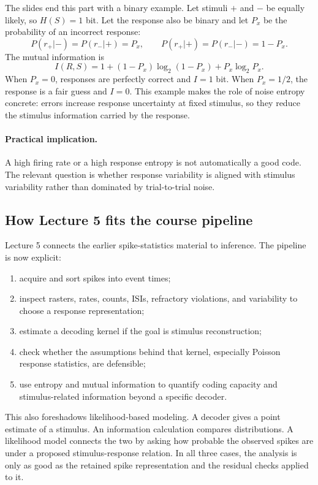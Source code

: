 The slides end this part with a binary example. Let stimuli $+$ and $-$ be equally likely, so $H(S)=1$ bit. Let the response also be binary and let $P_x$ be the probability of an incorrect response:
\[
    P(r_+|-)=P(r_-|+)=P_x,\qquad
    P(r_+|+)=P(r_-|-)=1-P_x.
\]
The mutual information is
\[
    I(R,S)
    =
    1
    +(1-P_x)\log_2(1-P_x)
    +P_x\log_2 P_x.
\]
When $P_x=0$, responses are perfectly correct and $I=1$ bit. When $P_x=1/2$, the response is a fair guess and $I=0$. This example makes the role of noise entropy concrete: errors increase response uncertainty at fixed stimulus, so they reduce the stimulus information carried by the response.

\paragraph{Practical implication.}
A high firing rate or a high response entropy is not automatically a good code. The relevant question is whether response variability is aligned with stimulus variability rather than dominated by trial-to-trial noise.

\subsection{How Lecture 5 fits the course pipeline}

Lecture 5 connects the earlier spike-statistics material to inference. The pipeline is now explicit:
\begin{enumerate}
    \item acquire and sort spikes into event times;
    \item inspect rasters, rates, counts, ISIs, refractory violations, and variability to choose a response representation;
    \item estimate a decoding kernel if the goal is stimulus reconstruction;
    \item check whether the assumptions behind that kernel, especially Poisson response statistics, are defensible;
    \item use entropy and mutual information to quantify coding capacity and stimulus-related information beyond a specific decoder.
\end{enumerate}

This also foreshadows likelihood-based modeling. A decoder gives a point estimate of a stimulus. An information calculation compares distributions. A likelihood model connects the two by asking how probable the observed spikes are under a proposed stimulus-response relation. In all three cases, the analysis is only as good as the retained spike representation and the residual checks applied to it.

